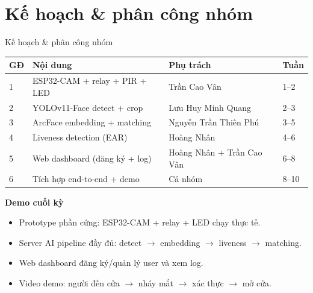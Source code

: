 \documentclass[aspectratio=169]{beamer}
\begin{document}
\section{Kế hoạch \& phân công nhóm}

\begin{frame}{Kế hoạch \& phân công nhóm}
  \scriptsize
  \renewcommand{\arraystretch}{1.18}
  \begin{tabular}{p{}p{}p{}p{}}
    \toprule
    \textbf{GĐ} & \textbf{Nội dung} & \textbf{Phụ trách} & \textbf{Tuần} \\
    \midrule
    1 & ESP32-CAM + relay + PIR + LED & Trần Cao Vân & 1--2 \\
    2 & YOLOv11-Face detect + crop & Lưu Huy Minh Quang & 2--3 \\
    3 & ArcFace embedding + matching & Nguyễn Trần Thiên Phú & 3--5 \\
    4 & Liveness detection (EAR) & Hoàng Nhân & 4--6 \\
    5 & Web dashboard (đăng ký + log) & Hoàng Nhân + Trần Cao Vân & 6--8 \\
    6 & Tích hợp end-to-end + demo & Cả nhóm & 8--10 \\
    \bottomrule
  \end{tabular}

  \vspace{0.7em}
  \textbf{Demo cuối kỳ}
  \begin{itemize}\setlength{\itemsep}{0.15em}
    \item Prototype phần cứng: ESP32-CAM + relay + LED chạy thực tế.
    \item Server AI pipeline đầy đủ: detect $\to$ embedding $\to$ liveness $\to$ matching.
    \item Web dashboard đăng ký/quản lý user và xem log.
    \item Video demo: người đến cửa $\to$ nháy mắt $\to$ xác thực $\to$ mở cửa.
  \end{itemize}
\end{frame}
\end{document}
